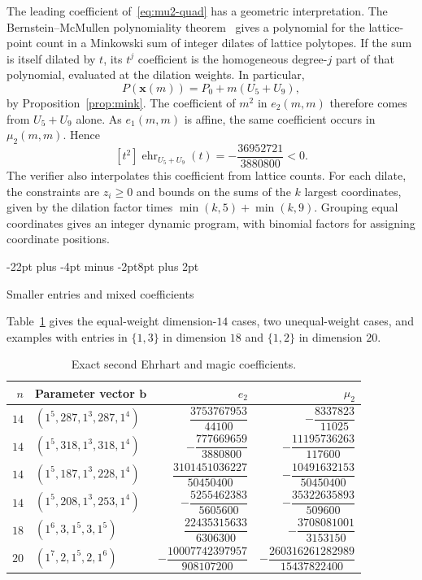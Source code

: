 \documentclass[11pt,letterpaper]{article}
\makeatletter
\renewcommand{\section}{\@startsection{section}{1}{\z@}%
  {-22pt plus -4pt minus -2pt}{8pt plus 2pt}%
  {\normalfont\fontsize{14}{17}\selectfont\bfseries\raggedright}}
\theoremstyle{result}
\theoremstyle{remark}
\newcommand{\vb}{\mathbf{b}}
\newcommand{\ehr}{\operatorname{ehr}}
\makeatother
\begin{document}
The leading coefficient of~\eqref{eq:mu2-quad} has a geometric interpretation. The Bernstein--McMullen polynomiality theorem~\cite{McM78} gives a polynomial for the lattice-point count in a Minkowski sum of integer dilates of lattice polytopes. If the sum is itself dilated by $t$, its $t^j$ coefficient is the homogeneous degree-$j$ part of that polynomial, evaluated at the dilation weights. In particular,
\[
P(\mathbf{x}(m))=P_0+m(U_5+U_9),
\]
by Proposition~\ref{prop:mink}. The coefficient of $m^2$ in $e_2(m,m)$ therefore comes from $U_5+U_9$ alone. As $e_1(m,m)$ is affine, the same coefficient occurs in $\mu_2(m,m)$. Hence
\begin{equation}\label{eq:U5U9}
[t^2]\ehr_{U_5+U_9}(t)=-\frac{36952721}{3880800}<0.
\end{equation}
The verifier also interpolates this coefficient from lattice counts. For each dilate, the constraints are $z_i\ge 0$ and bounds on the sums of the $k$ largest coordinates, given by the dilation factor times $\min(k,5)+\min(k,9)$. Grouping equal coordinates gives an integer dynamic program, with binomial factors for assigning coordinate positions.

\section{Smaller entries and mixed coefficients}
\label{sec:sharper}

Table~\ref{tab:counterexamples} gives the equal-weight dimension-$14$ cases, two unequal-weight cases, and examples with entries in $\{1,3\}$ in dimension $18$ and $\{1,2\}$ in dimension $20$.

\begin{table}[!ht]
\centering
\begin{minipage}{0.90\linewidth}
\caption{Exact second Ehrhart and magic coefficients.}
\label{tab:counterexamples}
\renewcommand{\arraystretch}{1.38}
\setlength{\tabcolsep}{12pt}
\begin{tabular*}{\linewidth}{@{\extracolsep{\fill}}rlrr@{}}
\toprule
$n$ & Parameter vector $\vb$ & $e_2$ & $\mu_2$ \\
\midrule
$14$ & $(1^5,287,1^3,287,1^4)$ & $\dfrac{3753767953}{44100}$ & $-\dfrac{8337823}{11025}$ \\
\addlinespace[7pt]
$14$ & $(1^5,318,1^3,318,1^4)$ & $-\dfrac{777669659}{3880800}$ & $-\dfrac{11195736263}{117600}$ \\
\addlinespace[7pt]
$14$ & $(1^5,187,1^3,228,1^4)$ & $\dfrac{3101451036227}{50450400}$ & $-\dfrac{10491632153}{50450400}$ \\
\addlinespace[7pt]
$14$ & $(1^5,208,1^3,253,1^4)$ & $-\dfrac{5255462383}{5605600}$ & $-\dfrac{35322635893}{509600}$ \\
\addlinespace[7pt]
$18$ & $(1^6,3,1^5,3,1^5)$ & $\dfrac{22435315633}{6306300}$ & $-\dfrac{3708081001}{3153150}$ \\
\addlinespace[7pt]
$20$ & $(1^7,2,1^5,2,1^6)$ & $-\dfrac{10007742397957}{908107200}$ & $-\dfrac{260316261282989}{15437822400}$ \\
\bottomrule
\end{tabular*}
\end{minipage}
\end{table}
\end{document}
